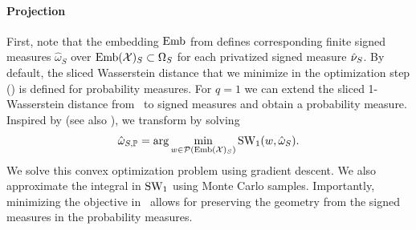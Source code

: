 \paragraph{Projection} First, note that the embedding $\text{Emb}$ from   defines corresponding finite signed measures $\hat \omega_S$ over $\text{Emb}(\mathcal X)_S \subset \Omega_S$ for each privatized signed measure $\hat \nu_{S}$. By default, the sliced Wasserstein distance that we minimize in the optimization step () is defined for probability measures. For $q=1$ we can extend the sliced 1-Wasserstein distance from~ to signed measures and obtain a probability measure.
Inspired by \citet{boedihardjo2022private} (see also \citep{donhauser2023certified}), we transform 
by solving %
\begin{equation}
    \hat \omega_{S, \mathbb P} = \arg\min_{w \in \mathcal P(\text{Emb}(\mathcal X)_S) } \text{SW}_1( w, \hat \omega_S).
    \label{eq:objective_preprocessing}
\end{equation}
We solve this convex optimization problem  using gradient descent. We also approximate the integral in $\text{SW}_1$ using Monte Carlo samples. Importantly, minimizing the objective in~ allows for preserving the geometry from the signed measures in the probability measures.

